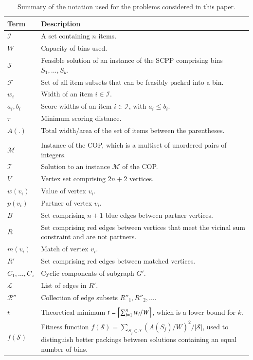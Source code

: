 \documentclass[a4paper,11pt,authoryear]{elsarticle}
\begin{document}
\begin{table}[h]
\centering
\caption{Summary of the notation used for the problems considered in this paper.}
\footnotesize
\begin{tabular}{l p{12cm}}
	\toprule
	Term & Description \\
	\midrule
	$\mathcal{I}$ & A set containing $n$ items. \\
	$W$ & Capacity of bins used.\\
	$\mathcal{S}$ & Feasible solution of an instance of the SCPP comprising bins $S_1,\dotsc,S_k$.\\
	$\mathcal{F}$ & Set of all item subsets that can be feasibly packed into a bin.\\
	$w_i$ & Width of an item $i \in \mathcal{I}$.\\
	$a_i, b_i$ & Score widths of an item $i \in \mathcal{I}$, with $a_i \leq b_i$.\\
	$\tau$ & Minimum scoring distance.\\
	$A(.)$ & Total width/area of the set of items between the parentheses.\\
	& \\
	$\mathcal{M}$ & Instance of the COP, which is a multiset of unordered pairs of integers.\\
	$\mathcal{T}$ & Solution to an instance $\mathcal{M}$ of the COP.\\
	$V$ & Vertex set comprising $2n+2$ vertices.\\
	$w(v_i)$ & Value of vertex $v_i$.\\
	$p(v_i)$ & Partner of vertex $v_i$.\\
	$B$ & Set comprising $n+1$ blue edges between partner vertices.\\
	$R$ & Set comprising red edges between vertices that meet the vicinal sum constraint and are not partners.\\
	$m(v_i)$ & Match of vertex $v_i$.\\
	$R'$ & Set comprising red edges between matched vertices.\\
	$C_1,\dotsc,C_z$ & Cyclic components of subgraph $G'$.\\
	$\mathcal{L}$ & List of edges in $R'$.\\
	$\mathcal{R}''$ & Collection of edge subsets $R''_1, R''_2,\dots$.\\
	& \\
	$t$ & Theoretical minimum $t = \ceil*{\sum_{i=1}^{n} w_i / W}$, which is a lower bound for $k$.\\
	$f(\mathcal{S})$ & Fitness function $f(\mathcal{S}) = \sum_{S_j \in \mathcal{S}} (A(S_j)/W)^2 / |\mathcal{S}|$, used to distinguish better packings between solutions containing an equal number of bins.\\
	\bottomrule
\end{tabular}	
\label{table:notation}
\end{table}
\end{document}
